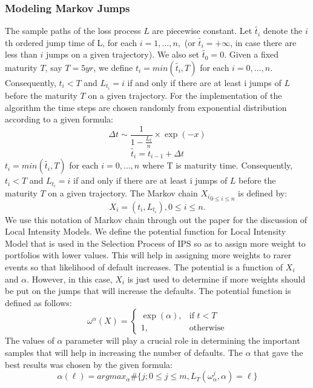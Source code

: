 \subsubsection{Modeling Markov Jumps}
The sample paths of the loss process $L$ are piecewise constant. Let $\tilde{t_{i}}$ denote the $i$th ordered jump time of L, for each $i = 1, \dots , n,$ (or $\tilde{t_{i}}  = + \infty$, in case there are less than $i$ jumps on a given trajectory). We also set $\tilde{t_{0}} = 0 $. Given a fixed maturity $T$, say $ T = 5yr$, we define $t_{i} = min(\tilde{t_{i}},T)$ for each $i = 0, \dots, n$. Consequently, $t_{i} < T$ and $L_{t_{i}} = i$ if and only if there are at least i jumps of $L$ before the maturity $T$ on a given trajectory. For the implementation of the algorithm the time steps are chosen randomly from exponential distribution according to a given formula:
\begin{equation}
\label{eqn:evolve}
\Delta t \sim \frac{1}{1-\frac{L_{t}}{n}} \times \exp(-x)
\end{equation}
\begin{equation}
\tilde{t_{i}} = t_{i-1} +  \Delta t
\end{equation}
$t_{i} = min(\tilde{t_{i}},T)$ for each $i = 0, \dots, n$ where T is maturity time. Consequently, $t_{i} < T$ and $L_{t_{i}} = i$ if and only if there are at least i jumps of $L$ before the maturity $T$ on a given trajectory. The Markov chain ${X_{i}}_{0 \leq i \leq n}$ is defined by: \\
\begin{equation}
X_{i} = (t_{i}, L_{t_{i}}), 0 \leq i \leq n.
\end{equation}
We use this notation of Markov chain through out the paper for the discussion of Local Intensity Models. 
We define the potential function for Local Intensity Model that is used in the Selection Process of IPS so as to assign more weight to portfolios with lower values. This will help in assigning more weights to rarer events so that likelihood of default increases. The potential is a function of $X_{i}$ and $\alpha$. However, in this case, $X_{i}$ is just used to determine if more weights should be put on the jumps that will increase the defaults. The potential function is defined as follows:
\begin{equation}
\omega^{\alpha}(X) = 
\begin{cases}
\exp(\alpha), & \text{if } t < T\\
1,               & \text{otherwise}
\end{cases}
\end{equation}
The values of $\alpha$ parameter will play a crucial role in determining the important samples that will help in increasing the number of defaults. The $\alpha$ that gave the best results was chosen by the given formula:
\begin{equation}
\alpha(\ell) = argmax_{\alpha} \# \{ j; 0 \leq j \leq m, L_{T}(\omega_{\alpha}^{j},\alpha) = \ell \}
\end{equation}
